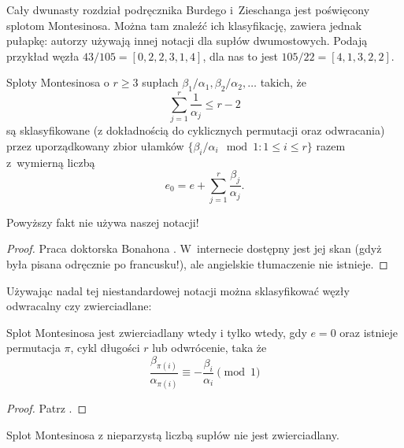 Cały dwunasty rozdział podręcznika Burdego i~Zieschanga \cite{burde03} jest poświęcony splotom Montesinosa.
Można tam znaleźć ich klasyfikację, zawiera jednak pułapkę: autorzy używają innej notacji dla supłów dwumostowych.
Podają przykład węzła $43/105 = [0, 2, 2, 3, 1, 4]$, dla nas to jest $105/22 = [4, 1, 3, 2, 2]$.

\begin{proposition}
    Sploty Montesinosa o $r \ge 3$ supłach $\beta_1/\alpha_1, \beta_2/\alpha_2, \ldots$ takich, że
    \begin{equation}
        \sum_{j=1}^r \frac{1}{\alpha_j} \le r - 2
    \end{equation}
    są sklasyfikowane (z dokładnością do cyklicznych permutacji oraz odwracania) przez uporządkowany zbior ułamków $\{\beta_i/\alpha_i \mod 1 : 1 \le i \le r\}$ razem z~wymierną liczbą
    \begin{equation}
        e_0 = e + \sum_{j=1}^r \frac{\beta_j}{\alpha_j}.
    \end{equation}
\end{proposition}

Powyższy fakt nie używa naszej notacji!

\begin{proof}
    Praca doktorska Bonahona \cite{bonahon79}.
    W~internecie dostępny jest jej skan (gdyż była pisana odręcznie po francusku!), ale angielskie tłumaczenie nie istnieje.
\end{proof}

Używając nadal tej niestandardowej notacji można sklasyfikować węzły odwracalny czy zwierciadlane:

\begin{proposition}
%
    Splot Montesinosa jest zwierciadlany wtedy i tylko wtedy, gdy $e = 0$ oraz istnieje permutacja $\pi$, cykl długości $r$ lub odwrócenie, taka że
    \begin{equation}
        \frac{\beta_{\pi(i)}}{\alpha_{\pi(i)}} \equiv -\frac{\beta_i}{\alpha_i} \pmod 1
    \end{equation}
\end{proposition}

\begin{proof}
    Patrz \cite[s. 230]{burde14}.
\end{proof}

\begin{corollary}
    Splot Montesinosa z nieparzystą liczbą supłów nie jest zwierciadlany.
\end{corollary}

